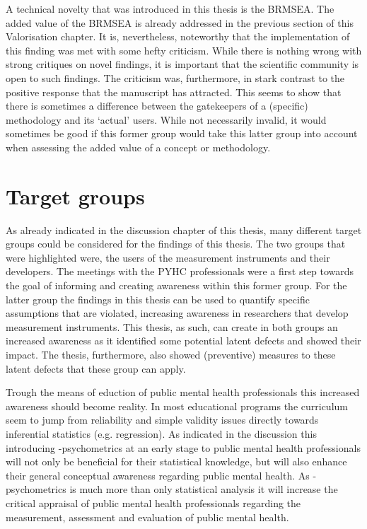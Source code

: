 A technical novelty that was introduced in this thesis is the BRMSEA. 
The added value of the BRMSEA is already addressed in the previous section of this Valorisation chapter.
It is, nevertheless, noteworthy that the implementation of this finding was met with some hefty criticism.
While there is nothing wrong with strong critiques on novel findings, it is important that the scientific community is open to such findings. 
The criticism was, furthermore, in stark contrast to the positive response that the manuscript has attracted. 
This seems to show that there is sometimes a difference between the gatekeepers of a (specific) methodology and its `actual' users. 
While not necessarily invalid, it would sometimes be good if this former group would take this latter group into account when assessing the added value of a concept or methodology.   

\section*{Target groups}
As already indicated in the discussion chapter of this thesis, many different target groups could be considered for the findings of this thesis. 
The two groups that were highlighted were, the users of the measurement instruments and their developers. 
The meetings with the PYHC professionals were a first step towards the goal of informing and creating awareness within this former group. 
For the latter group the findings in this thesis can be used to quantify specific assumptions that are violated, increasing awareness in researchers that develop measurement instruments. 
This thesis, as such, can create in both groups an increased awareness as it identified some potential latent defects and showed their impact. 
The thesis, furthermore, also showed (preventive) measures to these latent defects that these group can apply.  

Trough the means of eduction of public mental health professionals this increased awareness should become reality. 
In most educational programs the curriculum seem to jump from reliability and simple validity issues directly towards inferential statistics (e.g. regression). 
As indicated in the discussion this introducing \textbeta-psychometrics at an early stage to public mental health professionals will not only be beneficial for their statistical knowledge, but will also enhance their general conceptual awareness regarding public mental health. 
As \textbeta-psychometrics is much more than only statistical analysis it will increase the critical appraisal of public mental health professionals regarding the measurement, assessment and evaluation of public mental health. 

